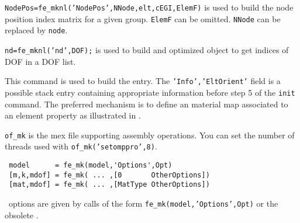 
{\tt NodePos=fe\_mknl('NodePos',NNode,elt,cEGI,ElemF)} is used to build the node position index matrix for a given group. {\tt ElemF} can be omitted. {\tt NNode} can be replaced by {\tt node}. 


{\tt nd=fe\_mknl('nd',DOF);} is used to build and optimized object to get indices of DOF in a DOF list.


This command is used to build the  entry. The {\tt 'Info','EltOrient'} field is a possible stack entry containing appropriate information before step 5 of the {\tt init} command. The preferred mechanism is to define an material map associated to an element property as illustrated in . 



{\tt of\_mk} is the mex file supporting assembly operations. You can set the number of threads used with {\tt  of\_mk('setomppro',8)}.



\rsyntax\begin{verbatim}
 model      = fe_mk(model,'Options',Opt)
 [m,k,mdof] = fe_mk( ... ,[0       OtherOptions])
 [mat,mdof] = fe_mk( ... ,[MatType OtherOptions])
\end{verbatim}


\femk\ options are given by calls of the form {\tt fe\_mk(model,'Options',Opt)} or the obsolete .

